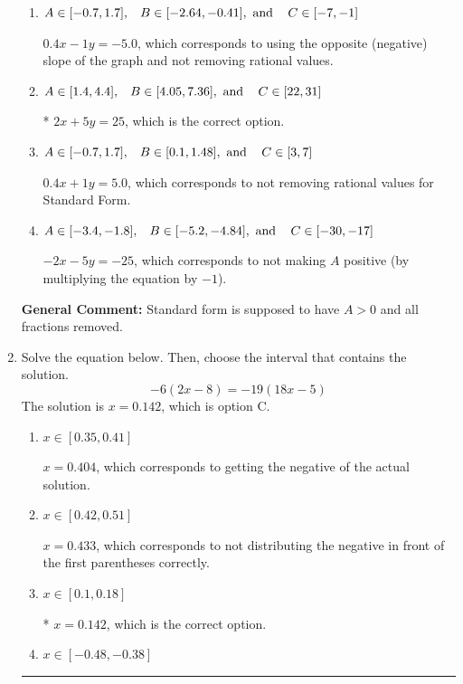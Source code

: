 \documentclass{extbook}[14pt]
\newcommand{\litem}[1]{\item #1

\rule{\textwidth}{0.4pt}}
\begin{document}
\begin{enumerate}
{\begin{enumerate}[label=\Alph*.]
 $2x - 5y = -25$, which corresponds to using the opposite (negative) slope of the graph, but did everything else correctly.
\item \( A \in [-0.7, 1.7], \hspace{3mm} B \in [-2.64, -0.41], \text{ and } \hspace{3mm} C \in [-7, -1] \)

 $0.4x - 1y = -5.0$, which corresponds to using the opposite (negative) slope of the graph and not removing rational values.
\item \( A \in [1.4, 4.4], \hspace{3mm} B \in [4.05, 7.36], \text{ and } \hspace{3mm} C \in [22, 31] \)

* $2x + 5y = 25$, which is the correct option.
\item \( A \in [-0.7, 1.7], \hspace{3mm} B \in [0.1, 1.48], \text{ and } \hspace{3mm} C \in [3, 7] \)

 $0.4x + 1y = 5.0$, which corresponds to not removing rational values for Standard Form.
\item \( A \in [-3.4, -1.8], \hspace{3mm} B \in [-5.2, -4.84], \text{ and } \hspace{3mm} C \in [-30, -17] \)

 $-2x - 5y = -25$, which corresponds to not making $A$ positive (by multiplying the equation by $-1$).
\end{enumerate}

\textbf{General Comment:} Standard form is supposed to have $A > 0$ and all fractions removed.
}
\litem{
Solve the equation below. Then, choose the interval that contains the solution.
\[ -6(2x -8) = -19(18x -5) \]The solution is \( x = 0.142 \), which is option C.\begin{enumerate}[label=\Alph*.]
\item \( x \in [0.35, 0.41] \)

$x = 0.404$, which corresponds to getting the negative of the actual solution.
\item \( x \in [0.42, 0.51] \)

$x = 0.433$, which corresponds to not distributing the negative in front of the first parentheses correctly.
\item \( x \in [0.1, 0.18] \)

* $x = 0.142$, which is the correct option.
\item \( x \in [-0.48, -0.38] \)


\end{enumerate}}
\end{enumerate}
\end{document}

